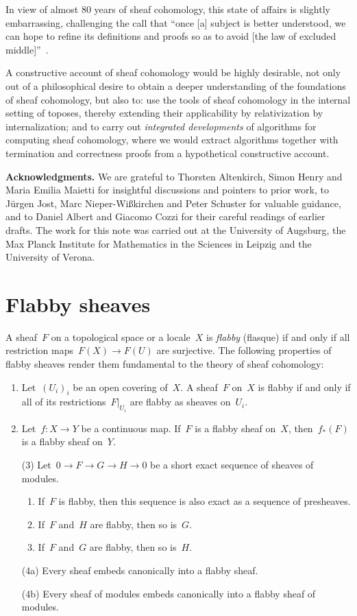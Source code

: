 \documentclass[oneside]{amsart}
\theoremstyle{definition}
\theoremstyle{plain}
\theoremstyle{remark}
\renewcommand{\_}{\mathpunct{.}\,}
\begin{document}
In view of almost 80 years of sheaf cohomology, this state of affairs is
slightly embarrassing, challenging the call that ``once [a] subject is better
understood, we can hope to refine its definitions and proofs so as to
avoid [the law of excluded middle]''~\cite[Section~3.4]{hott}.

A constructive account of sheaf cohomology would be highly desirable, not only
out of a philosophical desire to obtain a deeper understanding of the
foundations of sheaf cohomology, but also to: use the tools of sheaf cohomology
in the internal setting of toposes, thereby extending their applicability by
relativization by internalization; and to carry out \emph{integrated
developments} of algorithms for computing sheaf cohomology, where we would
extract algorithms together with termination and correctness proofs from a
hypothetical constructive account.


\textbf{Acknowledgments.} We are grateful to Thorsten Altenkirch, Simon Henry
and Maria Emilia Maietti for insightful discussions and pointers to prior work,
to Jürgen Jost, Marc Nieper-Wißkirchen and Peter Schuster for valuable
guidance, and to Daniel Albert and Giacomo Cozzi for their careful readings of
earlier drafts. The work for this note was carried out at the University of
Augsburg, the Max Planck Institute for Mathematics in the Sciences in
Leipzig and the University of Verona.


\section{Flabby sheaves}

A sheaf~$F$ on a topological space or a locale~$X$ is \emph{flabby} (flasque) if and only
if all restriction maps~$F(X) \to F(U)$ are surjective. The following
properties of flabby sheaves render them fundamental to the theory of sheaf
cohomology:
\begin{enumerate}
\item Let~$(U_i)_i$ be an open covering of~$X$.
A sheaf~$F$ on~$X$ is flabby if and only if all of its restrictions~$F|_{U_i}$
are flabby as sheaves on~$U_i$.
\item Let~$f : X \to Y$ be a continuous map. If~$F$ is a flabby sheaf on~$X$,
then~$f_*(F)$ is a flabby sheaf on~$Y$.
\item[(3)] Let~$0 \to F \to G \to H \to 0$ be a short exact sequence of sheaves of
modules.
\begin{enumerate}
\item If~$F$ is flabby, then this sequence is also exact as a sequence of
presheaves.
\item If~$F$ and~$H$ are flabby, then so is~$G$.
\item If~$F$ and~$G$ are flabby, then so is~$H$.
\end{enumerate}
\item[(4a)] Every sheaf embeds canonically into a flabby sheaf.
\item[(4b)] Every sheaf of modules embeds canonically into a flabby sheaf of modules.
\end{enumerate}
\end{document}

